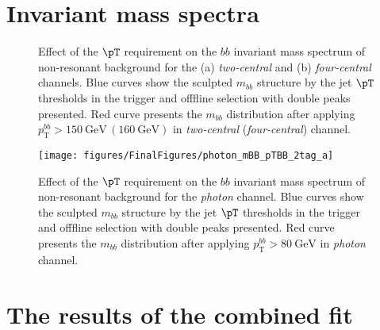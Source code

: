 \documentclass[PAPER, american,coverpage,texlive=2016, english]{\ATLASLATEXPATH atlasdoc}
\providecommand{\DIFaddbeginFL}{} %
\providecommand{\DIFaddendFL}{} %
\providecommand{\DIFdelbeginFL}{} %
\providecommand{\DIFdelendFL}{} %
\begin{document}
\clearpage

\section{Invariant mass spectra}

\begin{figure}[htbp]
\centering
\DIFdelbeginFL %
\DIFdelendFL \DIFaddbeginFL {}
\DIFaddendFL \caption{Effect of the $\pT$ requirement on the $bb$ invariant mass spectrum of non-resonant background for the (a) \textit{two-central} and (b) \textit{four-central} channels. Blue curves show the sculpted $m_{bb}$ structure by the jet $\pT$ thresholds in the trigger and offfline selection with double peaks presented. 
Red curve presents the $m_{bb}$ distribution after applying $p_{\mathrm{T}}^{bb}>\SI{150}{\GeV}\,(\SI{160}{\GeV})$ in \textit{two-central} (\textit{four-central}) channel.}
\label{fig:ptbb_cut_allhead}
\end{figure}


\begin{figure}[htbp]
\centering
\DIFdelbeginFL %
\DIFdelendFL \DIFaddbeginFL \texttt{[image: figures/FinalFigures/photon\_mBB\_pTBB\_2tag\_a]}
\DIFaddendFL \caption{Effect of the $\pT$ requirement on the $bb$ invariant mass spectrum of non-resonant background for the \textit{photon} channel. Blue curves show the sculpted $m_{bb}$ structure by the jet $\pT$ thresholds in the trigger and offfline selection with double peaks presented. 
Red curve presents the $m_{bb}$ distribution after applying $p_{\mathrm{T}}^{bb}>\SI{80}{\GeV}$ in \textit{photon}  channel.}
\label{fig:ptbb_cut}
\end{figure}

\clearpage
\section{The results of the combined fit}
\end{document}

